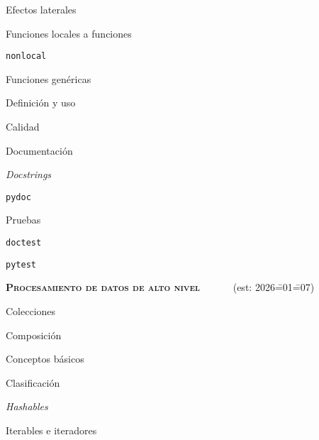 \begin{longenum}
\begin{longenum}
\begin{longenum}
\begin{longenum}
\begin{longenum}
                    \item Efectos laterales
                \end{longenum}
            \end{longenum}
            \item Funciones locales a funciones
            \begin{longenum}
                \item \texttt{nonlocal}
            \end{longenum}
        \end{longenum}
        \item Funciones genéricas
        \begin{longenum}
            \item Definición y uso
        \end{longenum}
        \item Calidad \opcional\
        \begin{longenum}
            \item Documentación
            \begin{longenum}
                \item \textit{Docstrings}
                \item \texttt{pydoc}
            \end{longenum}
            \item Pruebas
            \begin{longenum}
                \item \texttt{doctest}
                \item \texttt{pytest}
            \end{longenum}
        \end{longenum}
    \end{longenum}
    \item \textbf{\textsc{Procesamiento de datos de alto nivel}} \ce{6b}\ \ce{6c}\ \ce{6e}\ \ce{6f}\ \ev2\ \ra6\ (est: 2026\==01\==07)
    \begin{longenum}
        \item Colecciones
        \begin{longenum}
            \item Composición
            \item Conceptos básicos
            \item Clasificación
            \item \textit{Hashables}
        \end{longenum}
        \item Iterables e iteradores

\end{longenum}
\end{longenum}
